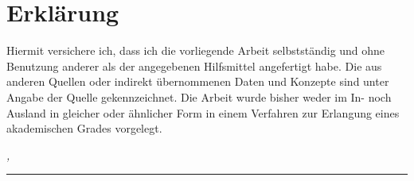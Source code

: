 \chapter*{Erklärung}
\label{sec:declaration}
\thispagestyle{empty}

Hiermit versichere ich, dass ich die vorliegende Arbeit selbstständig und ohne Benutzung anderer als der angegebenen Hilfsmittel angefertigt habe. Die aus anderen Quellen oder indirekt übernommenen Daten und Konzepte sind unter Angabe der Quelle gekennzeichnet. Die Arbeit wurde bisher weder im In- noch Ausland in gleicher oder ähnlicher Form in einem Verfahren zur Erlangung eines akademischen Grades vorgelegt.

\bigskip

\noindent\textit{\thesisUniversityCity, \thesisDate}

\smallskip

\begin{flushright}
	\begin{minipage}{5cm}
		\rule{\textwidth}{1pt}
		\centering\thesisName
	\end{minipage}
\end{flushright}

